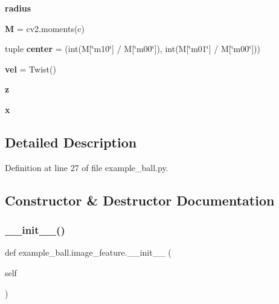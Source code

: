 \begin{DoxyCompactItemize}
{\bfseries radius}
\item 
\mbox{\label{classexample__ball_1_1image__feature_aa3815fb43e82cdb3e95d85ff4be92c48}} 
{\bfseries M} = cv2.\+moments(c)
\item 
\mbox{\label{classexample__ball_1_1image__feature_affd8b4658632f67ad1a4e9bc9d8904f9}} 
tuple {\bfseries center} = (int(M\mbox{[}\char`\"{}m10\char`\"{}\mbox{]} / M\mbox{[}\char`\"{}m00\char`\"{}\mbox{]}), int(M\mbox{[}\char`\"{}m01\char`\"{}\mbox{]} / M\mbox{[}\char`\"{}m00\char`\"{}\mbox{]}))
\item 
\mbox{\label{classexample__ball_1_1image__feature_a08779e337c89677720765503273eb4c7}} 
{\bfseries vel} = Twist()
\item 
\mbox{\label{classexample__ball_1_1image__feature_a890a1a14e71b51f12bf35b8397f6bdbc}} 
{\bfseries z}
\item 
\mbox{\label{classexample__ball_1_1image__feature_ae408a355d204e46c13b93215bc12cb9e}} 
{\bfseries x}
\end{DoxyCompactItemize}


\subsection{Detailed Description}


Definition at line 27 of file example\+\_\+ball.\+py.



\subsection{Constructor \& Destructor Documentation}
\mbox{\label{classexample__ball_1_1image__feature_a763c2126c33347904853ec4193273b8e}} 
\subsubsection{\texorpdfstring{\+\_\+\+\_\+init\+\_\+\+\_\+()}{\_\_init\_\_()}\hspace{0.1cm}{\footnotesize\ttfamily [1/3]}}
{\footnotesize\ttfamily def example\+\_\+ball.\+image\+\_\+feature.\+\_\+\+\_\+init\+\_\+\+\_\+ (\begin{DoxyParamCaption}\item[{}]{self }\end{DoxyParamCaption})}

